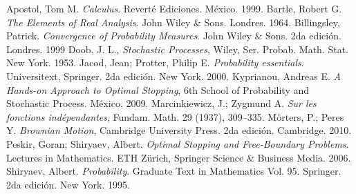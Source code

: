 \begin{thebibliography}{9}
\addtolength{\leftmargin}{0.2in}
\setlength{\itemindent}{-0.2in}

 Apostol, Tom M. \emph{Calculus}. Reverté Ediciones. México. 1999.
 Bartle, Robert G. \emph{The Elements of Real Analysis}. John Wiley \& Sons. Londres. 1964.
 Billingsley, Patrick. \emph{Convergence of Probability Measures}. John Wiley \& Sons. 2da edición. Londres. 1999
 Doob, J. L., \emph{Stochastic Processes}, Wiley, Ser. Probab. Math. Stat. New York. 1953.
 Jacod, Jean; Protter, Philip E. \emph{Probability essentials}. Universitext, Springer. 2da edición. New York. 2000.
 Kyprianou, Andreas E. \emph{A Hands-on Approach to Optimal Stopping}, 6th School of Probability and Stochastic Process. México. 2009.
 Marcinkiewicz, J.; Zygmund A. \emph{Sur les fonctions indépendantes}, Fundam. Math. 29 (1937), 309–335.
 Mörters, P.; Peres Y. \emph{Brownian Motion}, Cambridge University Press. 2da edición. Cambridge. 2010.
 Peskir, Goran; Shiryaev, Albert. \emph{Optimal Stopping and Free-Boundary Problems}. Lectures in Mathematics. ETH Zürich, Springer Science \& Business Media. 2006.
 Shiryaev, Albert. \emph{Probability}. Graduate Text in Mathematics Vol. 95. Springer. 2da edición. New York. 1995.

\end{thebibliography}